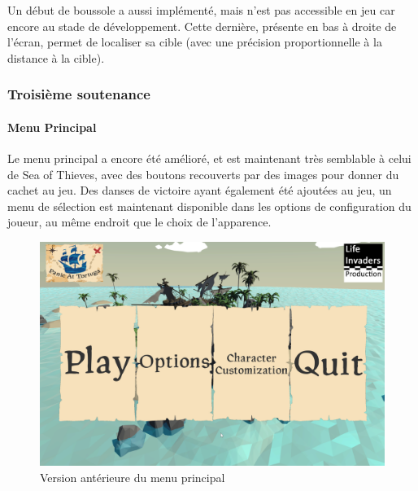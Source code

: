             Un début de boussole a aussi implémenté, mais n'est pas accessible en jeu car encore au stade de développement. Cette dernière, 
            présente en bas à droite de l'écran, permet de localiser sa cible (avec une précision proportionnelle à la distance à la cible).

    \subsubsection{Troisième soutenance}
    
        \paragraph{Menu Principal}
        
            Le menu principal a encore été amélioré, et est maintenant très semblable à celui de Sea of Thieves, avec des boutons recouverts 
            par des images pour donner du cachet au jeu. Des danses de victoire ayant également été ajoutées au jeu, un menu de sélection est maintenant 
            disponible dans les options de configuration du joueur, au même endroit que le choix de l'apparence.
        
            \begin{figure}[hbt!]
                \centering
                \includegraphics[scale=0.4]{img/mainmenu.png}
                \caption{Version antérieure du menu principal}
            \end{figure}

